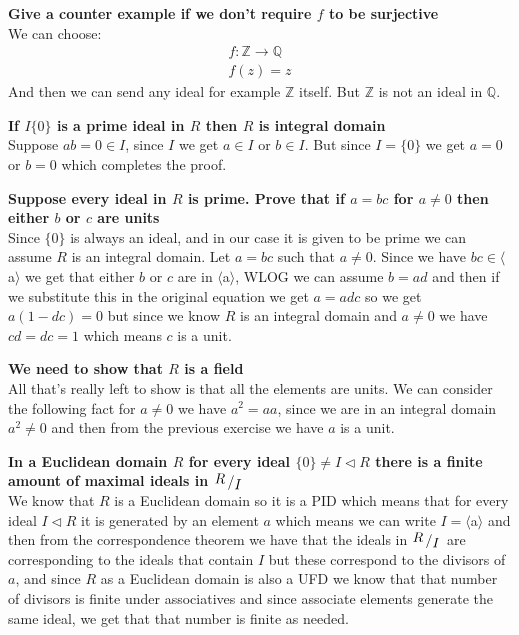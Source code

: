 \documentclass{article}
\theoremstyle{plain}
\DeclareMathOperator{\idealin}{\triangleleft}
\newcommand{\Z}{\mathbb{Z}}
\newcommand{\Q}{\mathbb{Q}}
\newcommand{\bigslant}[2]
{{\raisebox{.2em}{$#1$}\left/\raisebox{-.2em}{$#2$}\right.}}
\newcommand{\ideal}[1]
{\langle $#1$ \rangle}
\begin{document}
	\newpage
	
	\textbf{Give a counter example if we don't require $f$ to be surjective}\\
	We can choose:
	\begin{align*}
		f\colon\Z\to\Q \\
		f(z) = z
	\end{align*}
	And then we can send any ideal for example $\Z$ itself. But $\Z$ is
	not an ideal in $\Q$.
	
	\newpage
	
	\textbf{If $I \{0\}$ is a prime ideal in $R$ then $R$ is integral domain}
	\\
	Suppose $ab = 0\in I$, since $I$ we get $a\in I$ or $b\in I$. But
	since $I=\{0\}$ we get $a=0$ or $b=0$ which completes the proof. \\
	
	\newpage
	
	\textbf{Suppose every ideal in $R$ is prime. Prove that if $a=bc$ for
	$a\neq 0$ then either $b$ or $c$ are units} \\
	Since $\{0\}$ is always an ideal, and in our case it is given to be prime
	we can assume $R$ is an integral domain.
	Let $a=bc$ such that $a\neq 0$. Since we have $bc\in \ideal{a}$
	we get that either $b$ or $c$ are in $\ideal{a}$, WLOG we can assume
	$b = ad$ and then if we substitute this in the original equation
	we get $a=adc$ so we get $a(1-dc) = 0$ but since we know $R$ is an
	integral domain and $a\neq 0$ we have $cd = dc = 1$ which means $c$ is
	a unit.
	
	\newpage
	
	\textbf{We need to show that $R$ is a field} \\
	All that's really left to show is that all the elements are units.
	We can consider the following fact for $a\neq 0$ we have
	$a^2 = aa$, since we are in an integral domain $a^2 \neq 0$ and then
	from the previous exercise we have $a$ is a unit.
	
	\newpage
	
	\textbf{In a Euclidean domain $R$ for every ideal 
	$\{0\} \neq I \idealin R$ there is a finite amount of maximal ideals in
	$\bigslant{R}{I}$} \\
	We know that $R$ is a Euclidean domain so it is a PID which means that
	for every ideal $I \idealin R$ it is generated by an element $a$ which
	means we can write $I = \ideal{a}$ and then from the correspondence
	theorem we have that the ideals in $\bigslant{R}{I}$ are corresponding
	to the ideals that contain $I$ but these correspond to the divisors
	of $a$, and since $R$ as a Euclidean domain is also a UFD we know that
	that number of divisors is finite under associatives and since
	associate elements generate the same ideal, we get that that number
	is finite as needed.
	
\end{document}
